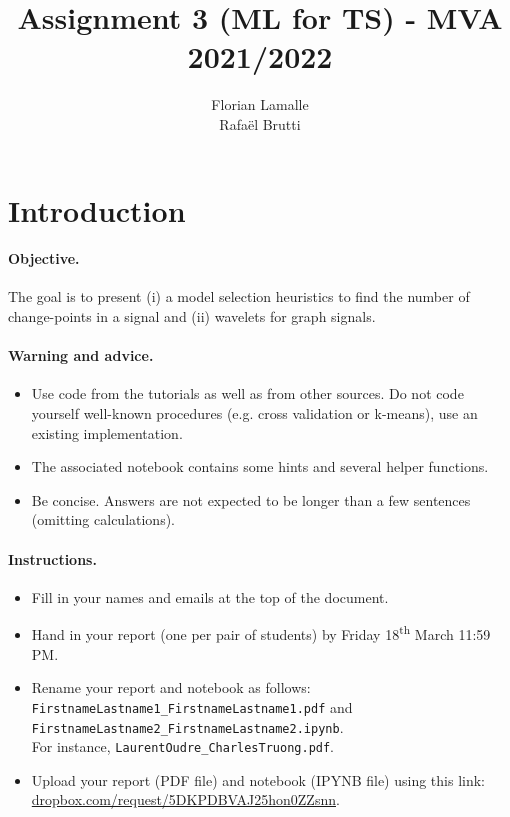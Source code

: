 \documentclass[11pt]{article}
\title{Assignment 3 (ML for TS) - MVA 2021/2022}
\author{
Florian Lamalle \email{florian.lamalle@telecom-paris.fr} \\ %
Rafaël Brutti \email{rafael.brutti@telecom-paris.fr} %
}
\begin{document}
\maketitle

\section{Introduction}

\paragraph{Objective.} The goal is to present (i) a model selection heuristics to find the number of change-points in a signal and (ii) wavelets for graph signals.

\paragraph{Warning and advice.} 
\begin{itemize}
    \item Use code from the tutorials as well as from other sources. Do not code yourself well-known procedures (e.g. cross validation or k-means), use an existing implementation.
    \item The associated notebook contains some hints and several helper functions.
    \item Be concise. Answers are not expected to be longer than a few sentences (omitting calculations).
\end{itemize}



\paragraph{Instructions.}
\begin{itemize}
    \item Fill in your names and emails at the top of the document.
    \item Hand in your report (one per pair of students) by Friday 18\textsuperscript{th} March 11:59 PM.
    \item Rename your report and notebook as follows:\\ \texttt{FirstnameLastname1\_FirstnameLastname1.pdf} and\\ \texttt{FirstnameLastname2\_FirstnameLastname2.ipynb}.\\
    For instance, \texttt{LaurentOudre\_CharlesTruong.pdf}.
    \item Upload your report (PDF file) and notebook (IPYNB file) using this link: \href{https://www.dropbox.com/request/5DKPDBVAJ25hon0ZZsnn}{dropbox.com/request/5DKPDBVAJ25hon0ZZsnn}.
\end{itemize}
\end{document}
